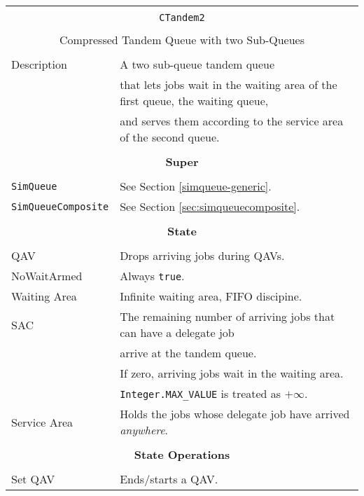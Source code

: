 \begin{tabular}{|l|l|}
	\hline
	\multicolumn{2}{|c|}{} \\
	\multicolumn{2}{|c|}{\lstinline[basicstyle=\large]{CTandem2}} \\
	\multicolumn{2}{|c|}{} \\
	\multicolumn{2}{|c|}{Compressed Tandem Queue with two Sub-Queues} \\
	\multicolumn{2}{|c|}{} \\
	\hline
	Description & A two sub-queue tandem queue \\
                & that lets jobs wait in the waiting area of the first queue, the waiting queue, \\
                & and serves them according to the service area of the second queue. \\
	\hline
\multicolumn{2}{|c|}{} \\
\multicolumn{2}{|c|}{\bf Super} \\
\multicolumn{2}{|c|}{} \\
\hline
\lstinline|SimQueue| & See Section \ref{simqueue-generic}. \\
\lstinline|SimQueueComposite| & See Section \ref{sec:simqueuecomposite}. \\
\hline
	\multicolumn{2}{|c|}{} \\
	\multicolumn{2}{|c|}{\bf State} \\
	\multicolumn{2}{|c|}{} \\
	\hline
	QAV & Drops arriving jobs during QAVs. \\
	\hline
	NoWaitArmed & Always \lstinline|true|. \\
	\hline
	Waiting Area & Infinite waiting area, FIFO discipine. \\
	\hline
	SAC & The remaining number of arriving jobs that can have a delegate job \\
	& arrive at the tandem queue. \\
	& If zero, arriving jobs wait in the waiting area. \\
	& \lstinline|Integer.MAX_VALUE| is treated as $+\infty$. \\
	\hline
	Service Area & Holds the jobs whose delegate job have arrived {\em anywhere}. \\
	\hline
	\multicolumn{2}{|c|}{} \\
	\multicolumn{2}{|c|}{\bf State Operations} \\
	\multicolumn{2}{|c|}{} \\
	\hline
	Set QAV & Ends/starts a QAV. \\

\end{tabular}
